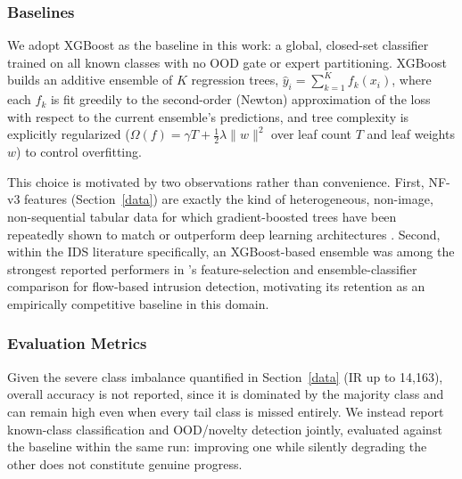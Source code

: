 \documentclass[sigconf]{acmart}
\begin{document}
\subsubsection{Baselines}
We adopt XGBoost \citep{chen2016xgboost} as the baseline in this work: a global, closed-set classifier trained on all known classes with no OOD gate or expert partitioning. XGBoost builds an additive ensemble of $K$ regression trees, $\hat{y}_i = \sum_{k=1}^{K} f_k(x_i)$, where each $f_k$ is fit greedily to the second-order (Newton) approximation of the loss with respect to the current ensemble's predictions, and tree complexity is explicitly regularized ($\Omega(f) = \gamma T + \frac{1}{2}\lambda \lVert w \rVert^2$ over leaf count $T$ and leaf weights $w$) to control overfitting.

This choice is motivated by two observations rather than convenience. First, NF-v3 features (Section~\ref{data}) are exactly the kind of heterogeneous, non-image, non-sequential tabular data for which gradient-boosted trees have been repeatedly shown to match or outperform deep learning architectures \citep{grinsztajn2022tree}. Second, within the IDS literature specifically, an XGBoost-based ensemble was among the strongest reported performers in \citep{zhou2020building}'s feature-selection and ensemble-classifier comparison for flow-based intrusion detection, motivating its retention as an empirically competitive baseline in this domain.

\subsubsection{Evaluation Metrics} \label{ssec:metrics}
Given the severe class imbalance quantified in Section~\ref{data} (IR up to 14,163), overall accuracy is not reported, since it is dominated by the majority class and can remain high even when every tail class is missed entirely. We instead report known-class classification and OOD/novelty detection jointly, evaluated against the baseline within the same run: improving one while silently degrading the other does not constitute genuine progress.
\end{document}
